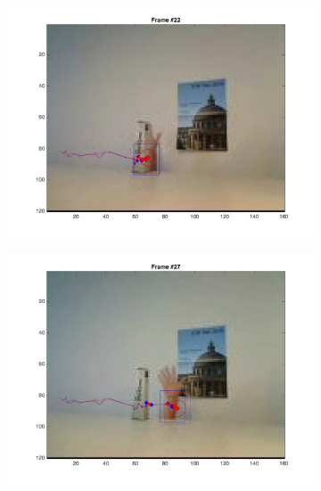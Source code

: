 \documentclass{ethz_report}
\begin{document}
\begin{figure}[h]
\begin{subfigure}[b]{.25\textwidth}
        \includegraphics[width=1\linewidth]{images/video2_observe_low_21}
    \end{subfigure}%
    \begin{subfigure}[b]{.25\textwidth}
        \centering
        \includegraphics[width=1\linewidth]{images/video2_observe_low_26}
    \end{subfigure}%
    \begin{subfigure}[b]{.25\textwidth}
        \centering

\end{subfigure}
\end{figure}
\end{document}
